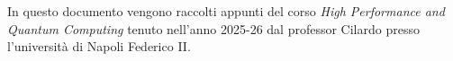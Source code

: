 In questo documento vengono raccolti appunti del corso \textit{High Performance and Quantum Computing} tenuto nell'anno 2025-26 dal professor Cilardo presso l'università di Napoli Federico II. 